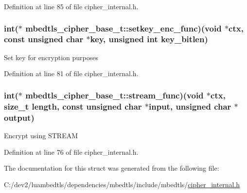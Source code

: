Definition at line 85 of file cipher\-\_\-internal.\-h.

\hypertarget{structmbedtls__cipher__base__t_a40976b94076be9ae19c01268ed61c7c7}{
\subsubsection[{setkey\-\_\-enc\-\_\-func}]{\setlength{\rightskip}{0pt plus 5cm}int($\ast$ mbedtls\-\_\-cipher\-\_\-base\-\_\-t\-::setkey\-\_\-enc\-\_\-func)(void $\ast$ctx, const unsigned char $\ast$key, unsigned int key\-\_\-bitlen)}}\label{structmbedtls__cipher__base__t_a40976b94076be9ae19c01268ed61c7c7}
Set key for encryption purposes 

Definition at line 81 of file cipher\-\_\-internal.\-h.

\hypertarget{structmbedtls__cipher__base__t_a78fcec085792ca33918b911a747a4b3f}{
\subsubsection[{stream\-\_\-func}]{\setlength{\rightskip}{0pt plus 5cm}int($\ast$ mbedtls\-\_\-cipher\-\_\-base\-\_\-t\-::stream\-\_\-func)(void $\ast$ctx, size\-\_\-t length, const unsigned char $\ast$input, unsigned char $\ast$output)}}\label{structmbedtls__cipher__base__t_a78fcec085792ca33918b911a747a4b3f}
Encrypt using S\-T\-R\-E\-A\-M 

Definition at line 76 of file cipher\-\_\-internal.\-h.



The documentation for this struct was generated from the following file\-:\begin{DoxyCompactItemize}
\item 
C\-:/dev2/luambedtls/dependencies/mbedtls/include/mbedtls/\hyperlink{cipher__internal_8h}{cipher\-\_\-internal.\-h}\end{DoxyCompactItemize}
